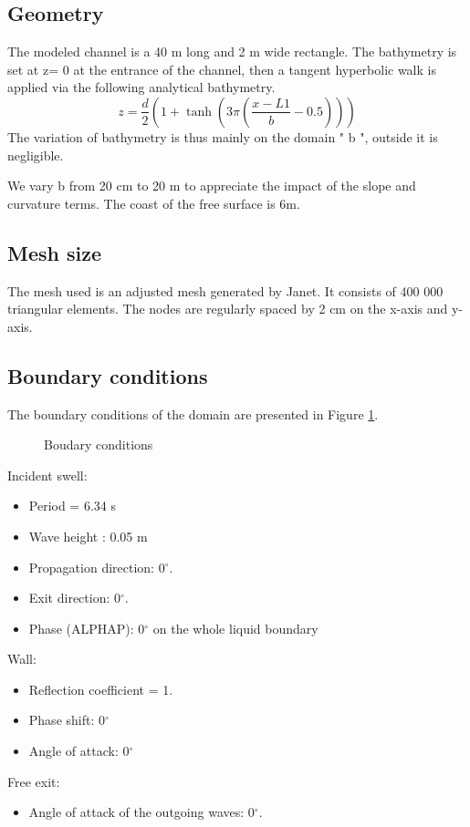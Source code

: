 \subsection{Geometry}
\label{recif:geometry}
The modeled channel is a 40 m long and 2 m wide rectangle.
The bathymetry is set at z= 0 at the entrance of the channel, then a tangent
hyperbolic walk is applied via the following analytical bathymetry.
$$
z=\frac{d}{2}( 1+ \tanh (3 \pi (\frac{x-L1}{b}-0.5) ) )
$$
The variation of bathymetry is thus mainly on the domain " b ", outside it is
negligible.

We vary b from 20 cm to 20 m to appreciate the impact of the slope and curvature terms.
The coast of the free surface is 6m.


\subsection{Mesh size}

The mesh used is an adjusted mesh generated by Janet. It consists of 400 000
triangular elements. The nodes are regularly spaced by 2 cm on the x-axis and y-axis.

\subsection{Boundary conditions}

The boundary conditions of the domain are presented in Figure \ref{fig:recif_bc}.

\begin{figure}[h]
\begin{center}
\end{center}
\caption{Boudary conditions}
\label{fig:recif_bc}
\end{figure}

Incident swell:
\begin{itemize}
\item Period = 6.34 s
\item Wave height : 0.05 m
\item Propagation direction: 0$^\circ$.
\item Exit direction: 0$^\circ$.
\item Phase (ALPHAP): 0$^\circ$ on the whole liquid boundary
\end{itemize}
Wall:
\begin{itemize}
\item Reflection coefficient = 1.
\item Phase shift: 0$^\circ$
\item Angle of attack: 0$^\circ$
\end{itemize}
Free exit:
\begin{itemize}
\item Angle of attack of the outgoing waves: 0$^\circ$.
\end{itemize}


